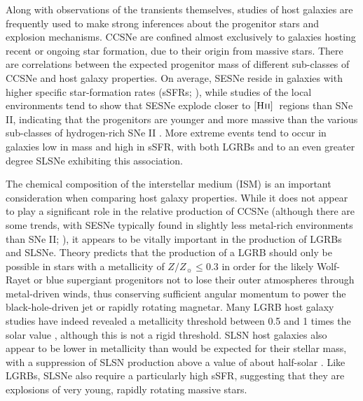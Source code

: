 \documentclass[fleqn,usenatbib,]{mnras}
\newcommand{\HII}[0]{$[\textnormal{\textsc{Hii}}]$}
\begin{document}
 Along with observations of the transients themselves, studies of host galaxies are frequently used to make strong inferences about the progenitor stars and explosion mechanisms. CCSNe are confined almost exclusively to galaxies hosting recent or ongoing star formation, due to their origin from massive stars. There are correlations between the expected progenitor mass of different sub-classes of CCSNe and host galaxy properties. On average, SESNe reside in galaxies with higher specific star-formation rates (sSFRs; \citealt{James2006,Kelly2008}), while studies of the local environments tend to show that SESNe explode closer to \HII~regions than SNe II, indicating that the progenitors are younger and more massive than the various sub-classes of hydrogen-rich SNe II  \citep[e.g.][]{Anderson2012,Galbany2018}. More extreme events tend to occur in galaxies low in mass and high in sSFR, with both LGRBs \citep[e.g.][]{Fruchter2006,LeFloch2006,Levesque2010,Kruehler2015,Vergani2015,Perley2016b,Palmerio2019,Taggart2019} and to an even greater degree SLSNe \citep[e.g.][]{Neill2011,Lunnan2014,Leloudas2015,Angus2016,Schulze2018,Taggart2019} exhibiting this association.
 
 The chemical composition of the interstellar medium (ISM) is an important consideration when comparing host galaxy properties. While it does not appear to play a significant role in the relative production of CCSNe (although there are some trends, with SESNe typically found in slightly less metal-rich environments than SNe II; \citealt{Galbany2018}), it appears to be vitally important in the production of LGRBs and SLSNe. Theory predicts that the production of a LGRB should only be possible in stars with a metallicity of $Z/Z_{\sun}\leq 0.3$ \citep{Woosley1993}  in order for the likely Wolf-Rayet or blue supergiant progenitors not to lose their outer atmospheres through metal-driven winds, thus conserving sufficient angular momentum to power the black-hole-driven jet or rapidly rotating magnetar. Many LGRB host galaxy studies have indeed revealed a metallicity threshold between 0.5 and 1 times the solar value \citep[e.g.][]{Stanek2006,Modjaz2008,Kruehler2015,Perley2016b,Japelj2016,Vergani2017}, although this is not a rigid threshold.  
SLSN host galaxies also appear to be lower in metallicity than would be expected for their stellar mass, with a suppression of SLSN production above a value of about half-solar \citep{Lunnan2014,Chen2016a,Perley2016c}. Like LGRBs, SLSNe also require a particularly high sSFR, suggesting that they are explosions of very young, rapidly rotating massive stars.
 
\end{document}
